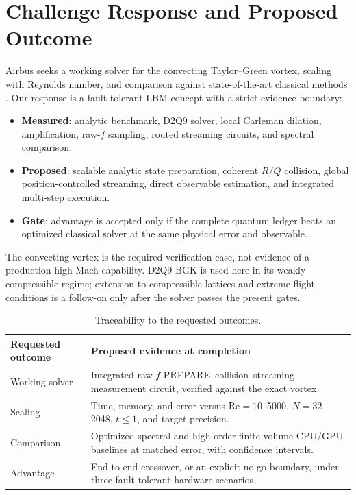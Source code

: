 \documentclass[10pt,twocolumn]{article}
\newcommand{\Rey}{\mathrm{Re}}
\newcommand{\measured}{\textcolor{resultgreen}{\textbf{Measured}}}
\newcommand{\proposed}{\textcolor{airbusblue}{\textbf{Proposed}}}
\newcommand{\gate}{\textcolor{warningorange}{\textbf{Gate}}}
\begin{document}
\section{Challenge Response and Proposed Outcome}
Airbus seeks a working solver for the convecting Taylor--Green vortex, scaling
with Reynolds number, and comparison against state-of-the-art classical
methods \cite{airbus2026}. Our response is a fault-tolerant LBM concept with a
strict evidence boundary:
\begin{itemize}
\item \measured: analytic benchmark, D2Q9 solver, local Carleman dilation,
amplification, raw-$f$ sampling, routed streaming circuits, and spectral
comparison.
\item \proposed: scalable analytic state preparation, coherent $R/Q$
collision, global position-controlled streaming, direct observable estimation,
and integrated multi-step execution.
\item \gate: advantage is accepted only if the complete quantum ledger beats
an optimized classical solver at the same physical error and observable.
\end{itemize}
The convecting vortex is the required verification case, not evidence of a
production high-Mach capability. D2Q9 BGK is used here in its weakly
compressible regime; extension to compressible lattices and extreme flight
conditions is a follow-on only after the solver passes the present gates.

\begin{table}[t]
\centering
\caption{Traceability to the requested outcomes.}
\label{tab:alignment}
\small
\begin{tabularx}{\columnwidth}{@{}p{}X@{}}
\toprule Requested outcome&Proposed evidence at completion\\\midrule
Working solver&Integrated raw-$f$ PREPARE--collision--streaming--measurement
circuit, verified against the exact vortex.\\
Scaling&Time, memory, and error versus $\Rey=10$--5000, $N=32$--2048,
$t\leq1$, and target precision.\\
Comparison&Optimized spectral and high-order finite-volume CPU/GPU baselines
at matched error, with confidence intervals.\\
Advantage&End-to-end crossover, or an explicit no-go boundary, under three
fault-tolerant hardware scenarios.\\\bottomrule
\end{tabularx}
\end{table}
\end{document}
